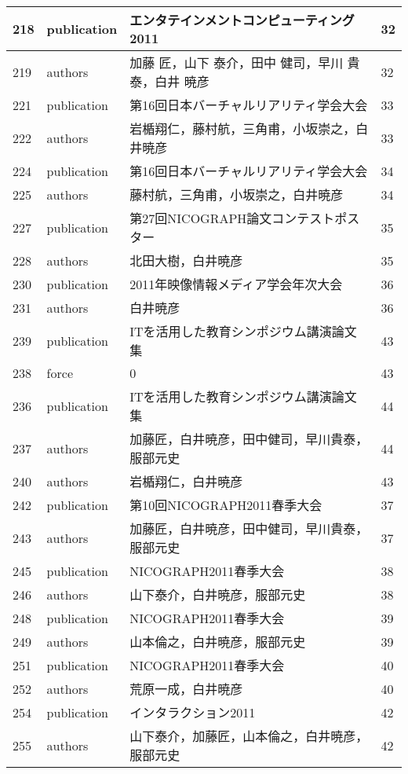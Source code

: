\begin{longtable}{|l|l|l|l|}
218 & publication & エンタテインメントコンピューティング2011 & 32 \\ \hline 
219 & authors & 加藤 匠，山下 泰介，田中 健司，早川 貴泰，白井 暁彦 & 32 \\ \hline 
221 & publication & 第16回日本バーチャルリアリティ学会大会 & 33 \\ \hline 
222 & authors & 岩楯翔仁，藤村航，三角甫，小坂崇之，白井暁彦 & 33 \\ \hline 
224 & publication & 第16回日本バーチャルリアリティ学会大会 & 34 \\ \hline 
225 & authors & 藤村航，三角甫，小坂崇之，白井暁彦 & 34 \\ \hline 
227 & publication & 第27回NICOGRAPH論文コンテストポスター & 35 \\ \hline 
228 & authors & 北田大樹，白井暁彦 & 35 \\ \hline 
230 & publication & 2011年映像情報メディア学会年次大会 & 36 \\ \hline 
231 & authors & 白井暁彦 & 36 \\ \hline 
239 & publication & ITを活用した教育シンポジウム講演論文集 & 43 \\ \hline 
238 & force & 0 & 43 \\ \hline 
236 & publication & ITを活用した教育シンポジウム講演論文集 & 44 \\ \hline 
237 & authors & 加藤匠，白井暁彦，田中健司，早川貴泰，服部元史 & 44 \\ \hline 
240 & authors & 岩楯翔仁，白井暁彦 & 43 \\ \hline 
242 & publication & 第10回NICOGRAPH2011春季大会 & 37 \\ \hline 
243 & authors & 加藤匠，白井暁彦，田中健司，早川貴泰，服部元史 & 37 \\ \hline 
245 & publication & NICOGRAPH2011春季大会 & 38 \\ \hline 
246 & authors & 山下泰介，白井暁彦，服部元史 & 38 \\ \hline 
248 & publication & NICOGRAPH2011春季大会 & 39 \\ \hline 
249 & authors & 山本倫之，白井暁彦，服部元史 & 39 \\ \hline 
251 & publication & NICOGRAPH2011春季大会 & 40 \\ \hline 
252 & authors & 荒原一成，白井暁彦 & 40 \\ \hline 
254 & publication & インタラクション2011 & 42 \\ \hline 
255 & authors & 山下泰介，加藤匠，山本倫之，白井暁彦，服部元史 & 42 \\ \hline 

\end{longtable}
